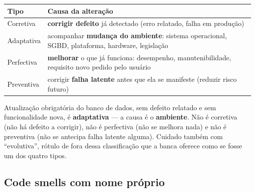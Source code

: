 \begin{center}
\begin{tabular}{@{}p{2.6cm}p{9.4cm}@{}}
\toprule
\textbf{Tipo} & \textbf{Causa da alteração} \\
\midrule
Corretiva & \textbf{corrigir defeito} já detectado (erro relatado, falha em produção) \\
Adaptativa & acompanhar \textbf{mudança do ambiente}: sistema operacional, SGBD, plataforma, hardware, legislação \\
Perfectiva & \textbf{melhorar} o que já funciona: desempenho, manutenibilidade, requisito novo pedido pelo usuário \\
Preventiva & corrigir \textbf{falha latente} antes que ela se manifeste (reduzir risco futuro) \\
\bottomrule
\end{tabular}
\end{center}

\begin{pegadinha}
Atualização obrigatória do banco de dados, sem defeito relatado e sem
funcionalidade nova, é \textbf{adaptativa} --- a causa é o \textbf{ambiente}.
Não é corretiva (não há defeito a corrigir), não é perfectiva (não se melhora
nada) e não é preventiva (não se antecipa falha latente alguma). Cuidado
também com ``evolutiva'', rótulo de fora dessa classificação que a banca
oferece como se fosse um dos quatro tipos.
\end{pegadinha}

\subsection{Code smells com nome próprio}

